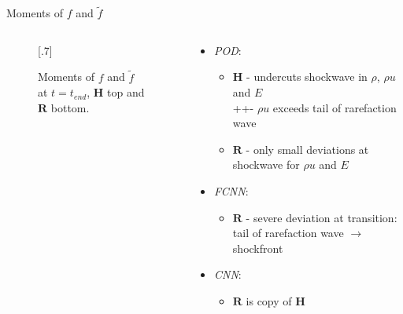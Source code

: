 \documentclass[usenames,dvipsnames,Nike,mathserif]{tuberlinbeamer}
\begin{document}
\begin{frame}[fragile]{Moments of $f$ and $\tilde{f}$}
	\begin{columns}
		\begin{column}{.61\textwidth}
			\begin{figure}
				\scalebox{.7}[.7]{}
				\caption{
					Moments of $f$ and $\tilde{f}$ at $t=t_{end}$, $\mathbf{H}$ top and $\mathbf{R}$ bottom.}
			\end{figure}
		\end{column}
		\begin{column}{.39\textwidth}
			\begin{itemize}
				\item\emph{POD}:
				\begin{itemize}
					\item $\mathbf{H}$ - undercuts shockwave in $\rho$, $\rho u$ and $E$\\
									   ++\quad - $\rho u$ exceeds tail of rarefaction wave
					
					\item $\mathbf{R}$ - only small deviations at shockwave for $\rho u$ and $E$
				\end{itemize}
				\item\emph{FCNN}:
				\begin{itemize}
					\item $\mathbf{R}$ - severe deviation at transition: tail of rarefaction wave $\rightarrow$ shockfront 
				\end{itemize}
				\item\emph{CNN}:
				\begin{itemize}
					\item $\mathbf{R}$ is copy of $\mathbf{H}$ 
				\end{itemize}
			\end{itemize}
		\end{column}
	\end{columns}
\end{frame}
\end{document}
